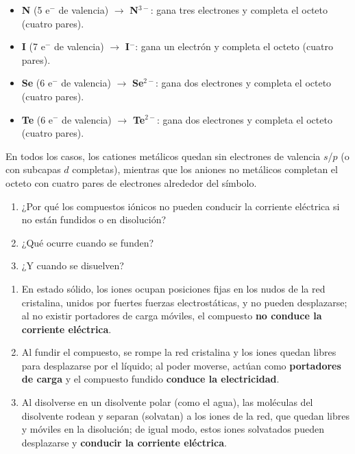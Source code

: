 \begin{exercise}
\begin{solu}
\begin{itemize}
            \item \textbf{N} (5 e\(^-\) de valencia) \(\rightarrow\) \textbf{N\(^{3-}\)}: gana tres electrones y completa el octeto (cuatro pares).
            \item \textbf{I} (7 e\(^-\) de valencia) \(\rightarrow\) \textbf{I\(^-\)}: gana un electrón y completa el octeto (cuatro pares).
            \item \textbf{Se} (6 e\(^-\) de valencia) \(\rightarrow\) \textbf{Se\(^{2-}\)}: gana dos electrones y completa el octeto (cuatro pares).
            \item \textbf{Te} (6 e\(^-\) de valencia) \(\rightarrow\) \textbf{Te\(^{2-}\)}: gana dos electrones y completa el octeto (cuatro pares).
        \end{itemize}

        En todos los casos, los cationes metálicos quedan sin electrones de valencia \(s\)/\(p\) (o con subcapas \(d\) completas), mientras que los aniones no metálicos completan el octeto con cuatro pares de electrones alrededor del símbolo.
    \end{solu}
\end{exercise}

\begin{exercise}
    \begin{enumerate}[label=\letraminuscula]
        \item ¿Por qué los compuestos iónicos no pueden conducir la corriente eléctrica si no están fundidos o en disolución?
        \item ¿Qué ocurre cuando se funden?
        \item ¿Y cuando se disuelven?
    \end{enumerate}
    \begin{solu}

        \begin{enumerate}[label=\letraminuscula]
            \item En estado sólido, los iones ocupan posiciones fijas en los nudos de la red cristalina, unidos por fuertes fuerzas electrostáticas, y no pueden desplazarse; al no existir portadores de carga móviles, el compuesto \textbf{no conduce la corriente eléctrica}.
            \item Al fundir el compuesto, se rompe la red cristalina y los iones quedan libres para desplazarse por el líquido; al poder moverse, actúan como \textbf{portadores de carga} y el compuesto fundido \textbf{conduce la electricidad}.
            \item Al disolverse en un disolvente polar (como el agua), las moléculas del disolvente rodean y separan (solvatan) a los iones de la red, que quedan libres y móviles en la disolución; de igual modo, estos iones solvatados pueden desplazarse y \textbf{conducir la corriente eléctrica}.
        \end{enumerate}
    \end{solu}
\end{exercise}

